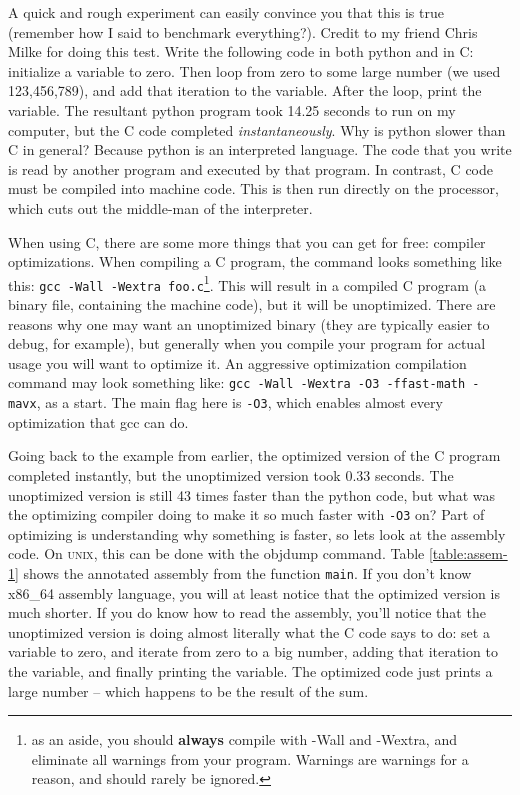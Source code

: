 A quick and rough experiment can easily convince you that this is true (remember how I said to
benchmark everything?). Credit to my friend Chris Milke for doing this test. Write the following
code in both python and in C: initialize a variable to zero. Then loop from zero to some large
number (we used 123,456,789), and add that iteration to the variable. After the loop, print the
variable. The resultant python program took 14.25 seconds to run on my computer, but the C code
completed \textit{instantaneously}. Why is python slower than C in general? Because python is
an interpreted language. The code that you write is read by another program and executed by
that program. In contrast, C code must be compiled into machine code. This is then run directly
on the processor, which cuts out the middle-man of the interpreter.

When using C, there are some more things that you can get for free: compiler optimizations. When
compiling a C program, the command looks something like this: \texttt{gcc -Wall -Wextra foo.c}\footnote{as an aside, you should \textbf{always} compile with -Wall and -Wextra, and eliminate all warnings from your program.
Warnings are warnings for a reason, and should rarely be ignored.}. This will
result in a compiled C program (a binary file, containing the machine code), but it will be
unoptimized. There are reasons why one may want an unoptimized binary (they are typically
easier to debug, for example), but generally when you compile your program for actual usage
you will want to optimize it. An aggressive optimization compilation command may look something
like: \texttt{gcc -Wall -Wextra -O3 -ffast-math -mavx}, as a start. The main flag here is \texttt{-O3}, which
enables almost every optimization that gcc can do.

Going back to the example from earlier, the optimized version of the C program completed instantly, but
the unoptimized version took 0.33 seconds. The unoptimized version is still 43 times faster than the
python code, but what was the optimizing compiler doing to make it so much faster with \texttt{-O3} on?
Part of optimizing is understanding why something is faster, so lets look at the assembly code. On \textsc{unix},
this can be done with the objdump command. Table \ref{table:assem-1} shows the annotated assembly from
the function \texttt{main}. If you don't know x86\_64 assembly language, you will at least notice that the
optimized version is much shorter. If you do know how to read the assembly, you'll notice that the unoptimized
version is doing almost literally what the C code says to do: set a variable to zero, and iterate from zero to
a big number, adding that iteration to the variable, and finally printing the variable. The optimized code just prints a large number -- which happens to be the result of the sum.

